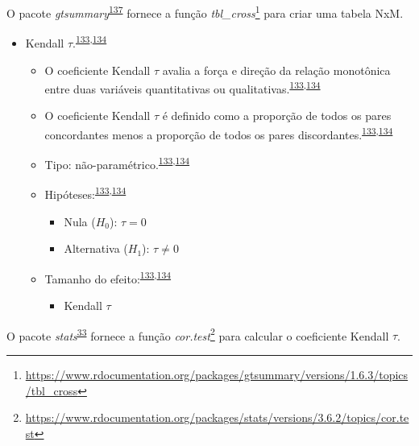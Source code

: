 \documentclass[
  a4paper,
]{book}
\providecommand{\tightlist}{%
  \setlength{\itemsep}{0pt}\setlength{\parskip}{0pt}}
\renewcommand{\href}[2]{#2\footnote{\url{#1}}}
\newenvironment{infobox}[1]
  {
  \begin{itemize}
  \renewcommand{\labelitemi}{
    \raisebox{-.7\height}[0pt][0pt]{
      {\setkeys{Gin}{width=3em,keepaspectratio}
        \texttt{[image: \#1]}}
    }
  }
  \setlength{\fboxsep}{1em}
  \begin{blackbox}
  \item
  }
  {
  \end{blackbox}
  \end{itemize}
  }
\begin{document}
\begin{infobox}{images/Rlogo}
O pacote \emph{gtsummary}\textsuperscript{\protect\hyperlink{ref-gtsummary}{137}} fornece a função \href{https://www.rdocumentation.org/packages/gtsummary/versions/1.6.3/topics/tbl_cross}{\emph{tbl\_cross}} para criar uma tabela NxM.

\end{infobox}

\begin{itemize}
\item
  Kendall \(\tau\).\textsuperscript{\protect\hyperlink{ref-khamis2008}{133},\protect\hyperlink{ref-allison2022}{134}}

  \begin{itemize}
  \item
    O coeficiente Kendall \(\tau\) avalia a força e direção da relação monotônica entre duas variáveis quantitativas ou qualitativas.\textsuperscript{\protect\hyperlink{ref-khamis2008}{133},\protect\hyperlink{ref-allison2022}{134}}
  \item
    O coeficiente Kendall \(\tau\) é definido como a proporção de todos os pares concordantes menos a proporção de todos os pares discordantes.\textsuperscript{\protect\hyperlink{ref-khamis2008}{133},\protect\hyperlink{ref-allison2022}{134}}
  \item
    Tipo: não-paramétrico.\textsuperscript{\protect\hyperlink{ref-khamis2008}{133},\protect\hyperlink{ref-allison2022}{134}}
  \item
    Hipóteses:\textsuperscript{\protect\hyperlink{ref-khamis2008}{133},\protect\hyperlink{ref-allison2022}{134}}

    \begin{itemize}
    \item
      Nula (\(H_{0}\)): \(\tau=0\)
    \item
      Alternativa (\(H_{1}\)): \(\tau≠0\)
    \end{itemize}
  \item
    Tamanho do efeito:\textsuperscript{\protect\hyperlink{ref-khamis2008}{133},\protect\hyperlink{ref-allison2022}{134}}

    \begin{itemize}
    \tightlist
    \item
      Kendall \(\tau\)
    \end{itemize}
  \end{itemize}
\end{itemize}

\begin{infobox}{images/Rlogo}
O pacote \emph{stats}\textsuperscript{\protect\hyperlink{ref-stats-2}{33}} fornece a função \href{https://www.rdocumentation.org/packages/stats/versions/3.6.2/topics/cor.test}{\emph{cor.test}} para calcular o coeficiente Kendall \(\tau\).

\end{infobox}
\end{document}
